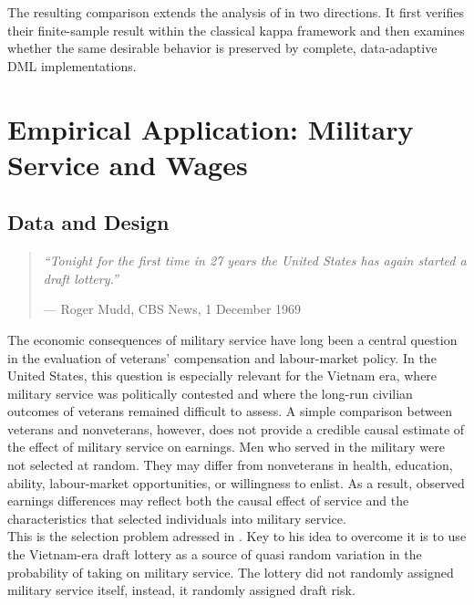\documentclass[12pt, a4paper, oneside]{article}
\theoremstyle{plain}
\theoremstyle{definition}
\begin{document}
The resulting comparison extends the analysis of
\citet{sloczynski2025abadie} in two directions. It first verifies their
finite-sample result within the classical kappa framework and then examines
whether the same desirable behavior is preserved by complete, data-adaptive
DML implementations. 



\newpage





\section{Empirical Application: Military Service and Wages}
\label{sec:vietnam}

\subsection{Data and Design}
\label{subsec:vietnam_data}
\begin{quotation}
\noindent\textit{``Tonight for the first time in 27 years the United
States has again started a draft lottery.''}

\smallskip
\noindent\hfill --- Roger Mudd, CBS News, 1 December 1969
\end{quotation}
The economic consequences of military service have long been a central question in the evaluation of veterans' compensation and labour-market policy. In the United States, this question is especially relevant for the Vietnam era, where military service was politically contested and where the long-run civilian outcomes of veterans remained difficult to assess. A simple comparison between veterans and nonveterans, however, does not provide a credible causal estimate of the effect of military service on earnings. Men who served in the military were not selected at random. They may differ from nonveterans in health, education, ability, labour-market opportunities, or willingness to enlist. As a result, observed earnings differences may reflect both the causal effect of service and the characteristics that selected individuals into military service.\\
This is the selection problem adressed in \citet{angrist1990lifetime}.
Key to his idea to overcome it is to use the Vietnam-era draft lottery as a source of quasi random variation in the probability of taking on military service. 
The lottery did not randomly assigned military service itself, instead, it randomly assigned draft risk.
\end{document}
